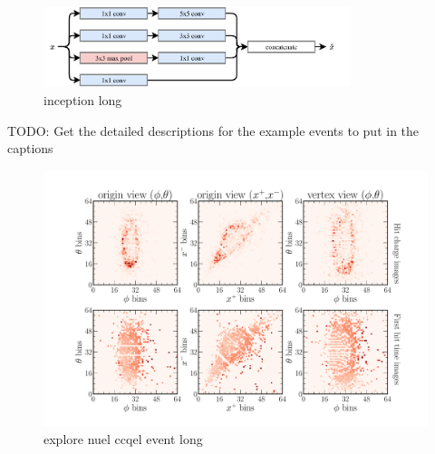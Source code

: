 \begin{figure} %
    \includegraphics[width=0.8\textwidth]{diagrams/6-cvn/inception.pdf}
    \caption[inception short]
    {inception long}
    \label{fig:se}
\end{figure} %

TODO: Get the detailed descriptions for the example events to put in the captions
\begin{figure} %
    \includegraphics[width=\textwidth]{diagrams/6-cvn/chipsnet/explore_nuel_ccqel_event.pdf}
    \caption[explore nuel ccqel event short]
    {explore nuel ccqel event long}
    \label{fig:explore_nuel_ccqel_event}
\end{figure} %

